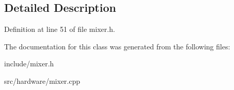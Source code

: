 \subsection{Detailed Description}


Definition at line 51 of file mixer.\-h.



The documentation for this class was generated from the following files\-:\begin{DoxyCompactItemize}
\item 
include/mixer.\-h\item 
src/hardware/mixer.\-cpp\end{DoxyCompactItemize}
